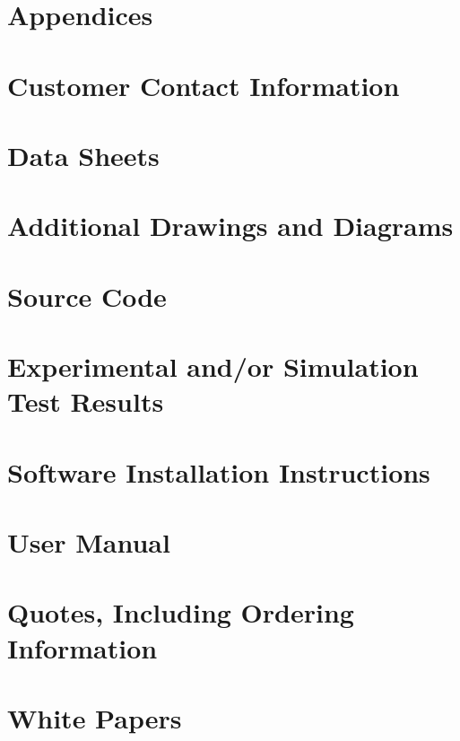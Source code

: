 \documentclass{article}
\begin{document}
\newpage
\section*{Appendices} %
\appendix
\section{Customer Contact Information}
\section{Data Sheets}
\section{Additional Drawings and Diagrams}
\section{Source Code} 
\section{Experimental and/or Simulation Test Results} 
\section{Software Installation Instructions} 
\section{User Manual} 
\section{Quotes, Including Ordering Information} 
\section{White Papers} 
\end{document}
